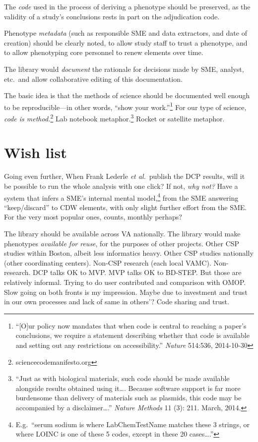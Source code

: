 \documentclass{tufte-handout}
\begin{document}
The \emph{code} used in the process of deriving a phenotype should be
preserved, as the validity of a study's conclusions rests in part on
the adjudication code.

Phenotype \emph{metadata} (such as responsible SME and data
extractors, and date of creation) should be clearly noted, to allow
study staff to trust a phenotype, and to allow phenotyping core
personnel to renew elements over time.

The library would \emph{document} the rationale for decisions made by
SME, analyst, etc.\ and allow collaborative editing of this
documentation.




The basic idea is that the methods of science should be documented
well enough to be reproducible---in other words, ``show your
work.''\footnote{``[O]ur policy now mandates that when code is central
  to reaching a paper's conclusions, we require a statement describing
  whether that code is available and setting out any restrictions on
  accessibility.'' \emph{Nature} 514:536, 2014-10-30} For our type of
science, \emph{code is method.}\footnote{sciencecodemanifesto.org} Lab
notebook metaphor.\footnote{``Just as with biological materials, such
  code should be made available alongside results obtained using
  it\ldots{}. Because software support is far more burdensome than
  delivery of materials such as plasmids, this code may be accompanied
  by a disclaimer\ldots{}.'' \emph{Nature Methods} 11 (3): 211. March,
  2014.} Rocket or satellite metaphor.

\section{Wish list}

Going even further, When Frank Lederle \emph{et al.}\ publish the DCP
results, will it be possible to run the whole analysis with one click?
If not, \emph{why not?} Have a system that infers a SME's internal
mental model,\footnote{E.g.\ ``serum sodium is where LabChemTestName
  matches these 3 strings, or where LOINC is one of these 5 codes,
  except in these 20 cases\ldots{}.''} from the SME answering
``keep/discard'' to CDW elements, with only slight further effort from
the SME. For the very most popular ones, counts, monthly perhaps?

The library should be available across VA nationally. The library would make phenotypes \emph{available for reuse}, for the
purposes of other projects. Other CSP
studies within Boston, albeit less informatics heavy. Other CSP
studies nationally (other coordinating centers). Non-CSP research
(each local VAMC). Non-research. DCP talks OK to MVP. MVP talks OK to
BD-STEP. But those are relatively informal. Trying to do user
contributed and comparison with OMOP. Slow going on both fronts is my
impression. Maybe due to investment and trust in our own processes and
lack of same in others'? Code sharing and trust.
\end{document}
